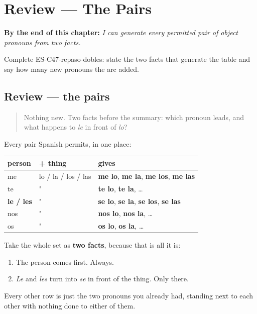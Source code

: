 
\chapter{Review --- The Pairs}
\label{ch:review-double-object}

\begin{chapteropening}
\textbf{By the end of this chapter:} \emph{I can generate every permitted pair of object pronouns from two facts.}

Complete ES-C47-repaso-dobles: state the two facts that generate the table and say how many new pronouns the arc added.
\end{chapteropening}

\section[Practice]{Review — the pairs}

\label{lesson:ES-C47-repaso-dobles}



\begin{quote}
Nothing new. Two facts before the summary: which pronoun leads, and what happens to \emph{le} in front of \emph{lo}?
\end{quote}

\begin{grammarlens}[title={What you've built}]
Every pair Spanish permits, in one place:

\noindent
\begin{tabularx}{\linewidth}{@{}>{\raggedright\arraybackslash}X>{\raggedright\arraybackslash}X>{\raggedright\arraybackslash}X@{}}
\toprule
\textbf{person} & \textbf{+ thing} & \textbf{gives} \\
\midrule
me & lo / la / los / las & \textbf{me lo}, \textbf{me la}, \textbf{me los}, \textbf{me las} \\
te & " & \textbf{te lo}, \textbf{te la}, … \\
\textbf{le / les} & " & \textbf{se lo}, \textbf{se la}, \textbf{se los}, \textbf{se las} \\
nos & " & \textbf{nos lo}, \textbf{nos la}, … \\
os & " & \textbf{os lo}, \textbf{os la}, … \\
\bottomrule
\end{tabularx}

Take the whole set as \textbf{two facts}, because that is all it is:

\begin{enumerate}
\raggedright
  \item The person comes first. Always.
  \item \emph{Le} and \emph{les} turn into \emph{se} in front of the thing. Only there.
\end{enumerate}

Every other row is just the two pronouns you already had, standing next to each other with nothing done to either of them.
\end{grammarlens}

